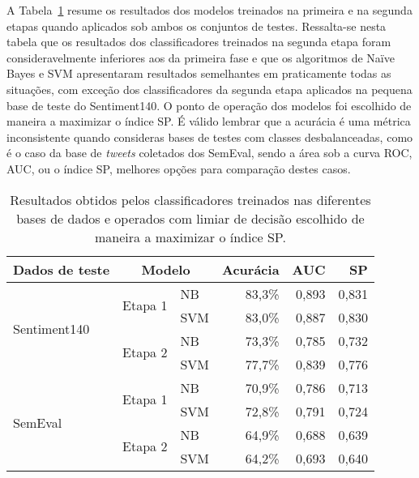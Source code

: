 A Tabela~\ref{tab:linear_perf} resume os resultados dos modelos treinados na primeira e na segunda etapas quando
aplicados sob ambos os conjuntos de testes.
Ressalta-se nesta tabela que os resultados dos classificadores treinados na segunda etapa foram consideravelmente
inferiores aos da primeira fase e que os algoritmos de Naïve Bayes e SVM apresentaram resultados semelhantes em
praticamente todas as situações, com exceção dos classificadores da segunda etapa aplicados na pequena base de teste
do Sentiment140.
O ponto de operação dos modelos foi escolhido de maneira a maximizar o índice SP.
É válido lembrar que a acurácia é uma métrica inconsistente quando consideras bases de testes com classes
desbalanceadas, como é o caso da base de \textit{tweets} coletados dos SemEval, sendo a área sob a curva ROC, AUC, ou o
índice SP, melhores opções para comparação destes casos.

\begin{table}[h]
    \begin{center}
        \begin{tabular}{ |l|l|l|r|r|r| }
            \hline
            \textbf{Dados de teste} & \multicolumn{2}{|c|}{\textbf{Modelo}}  & \textbf{Acurácia} & \textbf{AUC} & \textbf{SP} \\ \hline
            \multirow{4}{*}{Sentiment140} & \multirow{2}{*}{Etapa 1} & NB  & 83,3\% & 0,893 & 0,831 \\ \cline{3-6}
                                          &                          & SVM & 83,0\% & 0,887 & 0,830 \\ \cline{2-6}
                                          & \multirow{2}{*}{Etapa 2} & NB  & 73,3\% & 0,785 & 0,732 \\ \cline{3-6}
                                          &                          & SVM & 77,7\% & 0,839 & 0,776 \\ \hline
            \multirow{4}{*}{SemEval}      & \multirow{2}{*}{Etapa 1} & NB  & 70,9\% & 0,786 & 0,713 \\ \cline{3-6}
                                          &                          & SVM & 72,8\% & 0,791 & 0,724 \\ \cline{2-6}
                                          & \multirow{2}{*}{Etapa 2} & NB  & 64,9\% & 0,688 & 0,639 \\ \cline{3-6}
                                          &                          & SVM & 64,2\% & 0,693 & 0,640 \\ \hline
        \end{tabular}
        \caption{Resultados obtidos pelos classificadores treinados nas diferentes bases de dados e operados com limiar de decisão escolhido de maneira a maximizar o índice SP.}
        \label{tab:linear_perf}
    \end{center}
\end{table}

